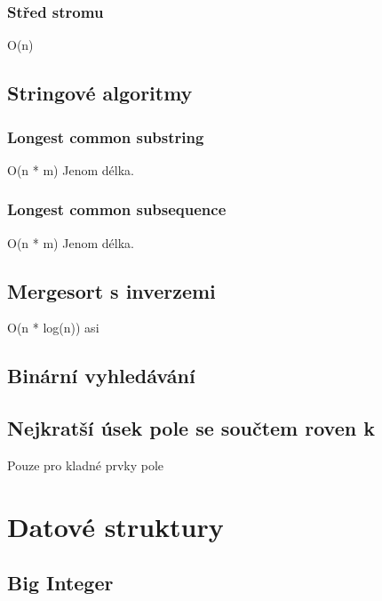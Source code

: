 \documentclass[10pt, a4paper, twoside]{article}
\begin{document}
\subsubsection{Střed stromu}
O(n)



\subsection{Stringové algoritmy}
\subsubsection{Longest common substring}
O(n * m)
Jenom délka.


\subsubsection{Longest common subsequence}
O(n * m)
Jenom délka.


\subsection{Mergesort s inverzemi}
O(n * log(n)) asi


\subsection{Binární vyhledávání}


\subsection{Nejkratší úsek pole se součtem roven k}
Pouze pro kladné prvky pole


\newpage

\section{Datové struktury}

\subsection{Big Integer}

\end{document}

